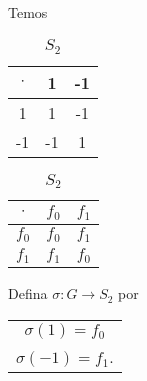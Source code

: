 \documentclass{beamer}
\begin{document}
    \begin{frame}
        Temos
        \begin{table}
            \begin{minipage}{.5\linewidth}
                \caption*{$G$}
                \centering
                \begin{tabular}{|c|c|c|}
                    \hline
                    $\cdot$ & 1 & -1\\
                    \hline
                    1 & 1 & -1\\
                    \hline
                    -1 & -1 & 1\\
                    \hline
                \end{tabular}
            \end{minipage}%
            \pause
            \begin{minipage}{.5\linewidth}
                \caption*{$S_2$}
                \centering
                \begin{tabular}{|c|c|c|}
                    \hline
                    $\cdot$ & $f_0$ & $f_1$\\
                    \hline
                    $f_0$ & $f_0$ & $f_1$\\
                    \hline
                    $f_1$ & $f_1$ & $f_0$\\
                    \hline
                \end{tabular}
            \end{minipage} 
        \end{table}

        \vspace{.4cm}

        Defina $\sigma : G \to S_2$ por
        \begin{center}
            \begin{tabular}{c}
                $\sigma(1) = f_0$\\
                $\sigma(-1) = f_1$.
            \end{tabular}
        \end{center}
    \end{frame}
\end{document}
